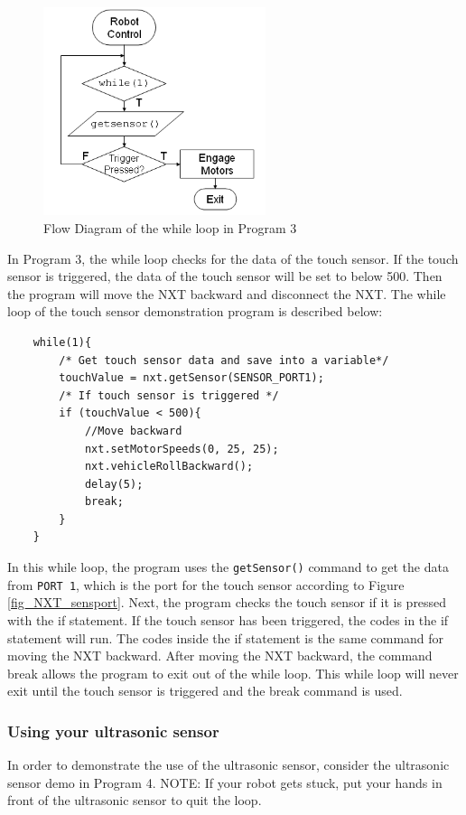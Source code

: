 \begin{figure}[h]
  \begin{center}
    \includegraphics[height=2.4in]{figure/mindstorm/NXT_touchflow.png}
    \caption{Flow Diagram of the while loop in Program 3 \label{fig_NXT_touchflow}}
  \end{center}
\end{figure}
\noindent
In Program 3, the while loop checks for the data of the touch sensor. If the touch sensor is triggered, 
the data of the touch sensor will be set to below 500. Then the program will move the NXT backward and 
disconnect the NXT. The while loop of the touch sensor demonstration program is described below:
\begin{verbatim}
    while(1){
        /* Get touch sensor data and save into a variable*/
        touchValue = nxt.getSensor(SENSOR_PORT1);
        /* If touch sensor is triggered */
        if (touchValue < 500){
            //Move backward
            nxt.setMotorSpeeds(0, 25, 25);
            nxt.vehicleRollBackward();
            delay(5);
            break;
        }
    }
\end{verbatim}
In this while loop, the program uses the \verb+getSensor()+ command to get the data from \verb+PORT 1+, 
which is the port for the touch sensor according to Figure \ref{fig_NXT_sensport}. Next, the program checks 
the touch sensor if it is pressed with the if statement. If the touch sensor has been triggered, the codes 
in the if statement will run. The codes inside the if statement is the same command for moving the NXT 
backward. After moving the NXT backward, the command break allows the program to exit out of the while loop.
 This while loop will never exit until the touch sensor is triggered and the break command is used.

\subsubsection{Using your ultrasonic sensor}
In order to demonstrate the use of the ultrasonic sensor, consider the ultrasonic sensor demo in Program 4.
NOTE: If your robot gets stuck, put your hands in front of the ultrasonic sensor to quit the loop.

